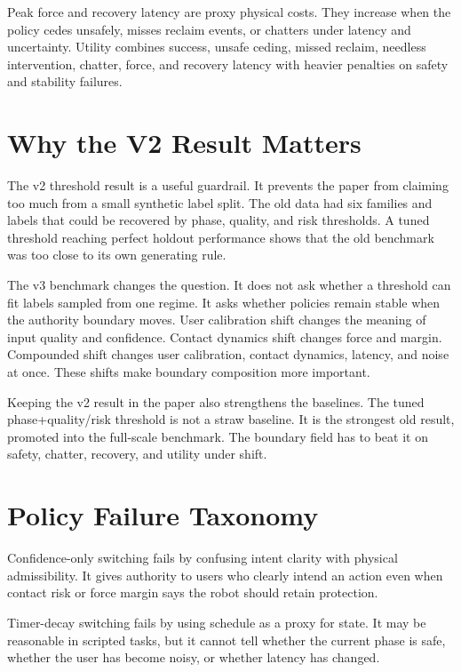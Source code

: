 \documentclass{article}
\begin{document}
Peak force and recovery latency are proxy physical costs. They increase when the policy cedes unsafely, misses reclaim events, or chatters under latency and uncertainty. Utility combines success, unsafe ceding, missed reclaim, needless intervention, chatter, force, and recovery latency with heavier penalties on safety and stability failures.

\clearpage
\section{Why the V2 Result Matters}

The v2 threshold result is a useful guardrail. It prevents the paper from claiming too much from a small synthetic label split. The old data had six families and labels that could be recovered by phase, quality, and risk thresholds. A tuned threshold reaching perfect holdout performance shows that the old benchmark was too close to its own generating rule.

The v3 benchmark changes the question. It does not ask whether a threshold can fit labels sampled from one regime. It asks whether policies remain stable when the authority boundary moves. User calibration shift changes the meaning of input quality and confidence. Contact dynamics shift changes force and margin. Compounded shift changes user calibration, contact dynamics, latency, and noise at once. These shifts make boundary composition more important.

Keeping the v2 result in the paper also strengthens the baselines. The tuned phase+quality/risk threshold is not a straw baseline. It is the strongest old result, promoted into the full-scale benchmark. The boundary field has to beat it on safety, chatter, recovery, and utility under shift.

\clearpage
\section{Policy Failure Taxonomy}

Confidence-only switching fails by confusing intent clarity with physical admissibility. It gives authority to users who clearly intend an action even when contact risk or force margin says the robot should retain protection.

Timer-decay switching fails by using schedule as a proxy for state. It may be reasonable in scripted tasks, but it cannot tell whether the current phase is safe, whether the user has become noisy, or whether latency has changed.
\end{document}
